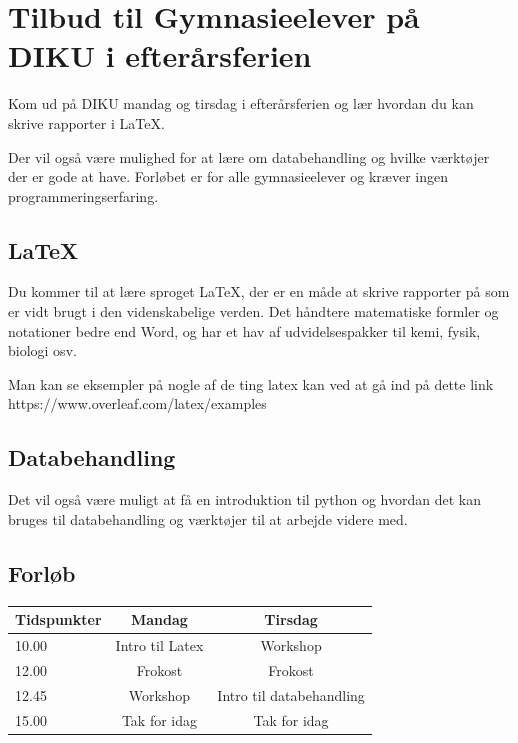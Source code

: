 \documentclass[14pt]{article}
\begin{document}
    \newpage                %
    \setcounter{page}{1}    %
\section*{Tilbud til Gymnasieelever på DIKU i efterårsferien}
Kom ud på DIKU mandag og tirsdag i efterårsferien og lær hvordan du kan skrive
rapporter i LaTeX.

Der vil også være mulighed for at lære om databehandling og hvilke værktøjer der
er gode at have. Forløbet er for alle gymnasieelever og kræver ingen
programmeringserfaring.
\subsection*{LaTeX}
    Du kommer til at lære sproget LaTeX, der er en måde at skrive rapporter på
    som er vidt brugt i den videnskabelige verden. Det håndtere matematiske
    formler og notationer bedre end Word, og har et hav af udvidelsespakker til
    kemi, fysik, biologi osv.

    Man kan se eksempler på nogle af de ting latex kan ved at gå ind på dette
    link https://www.overleaf.com/latex/examples

\subsection*{Databehandling}
Det vil også være muligt at få en introduktion til python og hvordan det kan
bruges til databehandling og værktøjer til at arbejde videre med.

\subsection*{Forløb}

\Large{
\begin{center}
\begin{tabular}{ l || c | c }
    Tidspunkter &  Mandag & Tirsdag \\
    \hline
    10.00 & Intro til Latex & Workshop \\
    12.00 & Frokost         & Frokost \\
    12.45 & Workshop        & Intro til databehandling \\
    15.00 & Tak for idag    & Tak for idag \\
\end{tabular}
\end{center}
}
\end{document}
